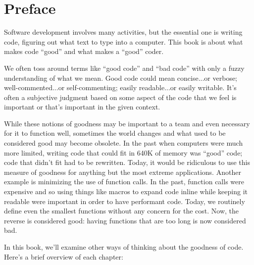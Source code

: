 \chapter{Preface} Software development involves many activities, but the
essential one is writing code, figuring out what text to type into a computer.
This book is about what makes code ``good'' and what makes a ``good'' coder.

We often toss around terms like ``good code'' and ``bad code'' with only a
fuzzy understanding of what we mean. Good code could mean concise...or verbose;
well-commented...or self-commenting; easily readable...or easily writable. It's
often a subjective judgment based on some aspect of the code that we feel is
important or that's important in the given context.

While these notions of goodness may be important to a team and even necessary
for it to function well, sometimes the world changes and what used to be
considered good may become obsolete. In the past when computers were much more
limited, writing code that could fit in 640K of memory was ``good'' code; code
that didn't fit had to be rewritten. Today, it would be ridiculous to use this
measure of goodness for anything but the most extreme applications. Another
example is minimizing the use of function calls. In the past, function calls
were expensive and so using things like macros to expand code inline while
keeping it readable were important in order to have performant code. Today, we
routinely define even the smallest functions without any concern for the cost.
Now, the reverse is considered good: having functions that are too long is now
considered bad.

In this book, we'll examine other ways of thinking about the goodness of code.
Here's a brief overview of each chapter:

